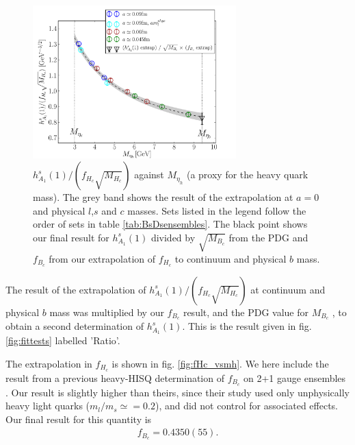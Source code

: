 \begin{figure}[htb!]
  \begin{center}
  \hspace{-10pt}
  \includegraphics[width=0.70\textwidth]{images/BsDsstar/hA1overfHc.pdf}
  \caption{ $h_{A_1}^s(1)/(f_{H_c}\sqrt{M_{H_c}})$ against $M_{\eta_h}$ (a proxy for the heavy quark mass). The grey band shows the result of the extrapolation at $a=0$ and physical $l$,$s$ and $c$ masses. Sets listed in the legend follow the order of sets in table \ref{tab:BsDsensembles}. The black point shows our final result for $h_{A_1}^s(1)$ divided by $\sqrt{M_{B_c}}$ from the PDG \cite{PhysRevD.98.030001} and $f_{B_c}$ from our extrapolation of $f_{H_c}$ to continuum and physical $b$ mass. \label{fig:fHc}}
  \end{center}
\end{figure}

The result of the extrapolation of $h_{A_1}^s(1)/(f_{H_c}\sqrt{M_{H_c}})$ at continuum and physical $b$ mass was multiplied by our $f_{B_c}$ result, and the PDG value for $M_{B_c}$ \cite{PhysRevD.98.030001}, to obtain a second determination of $h_{A_1}^s(1)$. This is the result given in fig. \ref{fig:fittests} labelled 'Ratio'.

The extrapolation in $f_{H_c}$ is shown in fig. \ref{fig:fHc_vsmh}. We here include the result from a previous heavy-HISQ determination of $f_{B_c}$ on 2+1 gauge ensembles \cite{McNeile:2012qf}. Our result is slightly higher than theirs, since their study used only unphysically heavy light quarks ($m_l/m_s\simeq=0.2$), and did not control for associated effects. Our final result for this quantity is
\begin{align}
  f_{B_c} = 0.4350(55).
\end{align}

